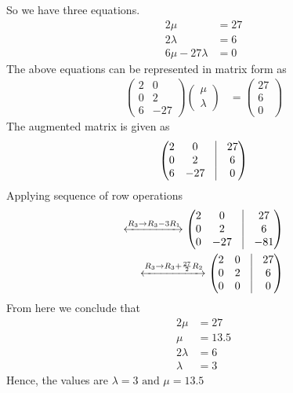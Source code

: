 \documentclass[12pt]{article}
\newcommand{\myvec}[1]{\ensuremath{\begin{pmatrix}#1\end{pmatrix}}}
\begin{document}
So we have three equations.
\begin{align}
	2\mu&=27\\
	2\lambda&=6\\
	6\mu-27\lambda&=0
\end{align}
The above equations can be represented in matrix form as
\begin{align}
	\myvec{2&0\\0&2\\6&-27}\myvec{\mu\\\lambda}&=\myvec{27\\6\\0}
\end{align}
The augmented matrix is given as
\begin{align}
	\myvec{2 & 0 & \vrule & 27\\0 & 2 & \vrule & 6\\ 6 & -27 & \vrule & 0}
\end{align}
Applying sequence of row operations
\begin{align}
	\xleftrightarrow{R_{3}\rightarrow R_{3}-3R_{1}}  	
	\myvec{2 & 0 & \vrule & 27\\0 & 2 & \vrule & 6\\ 0 & -27 & \vrule & -81}\\
	\xleftrightarrow{R_{3}\rightarrow R_{3}+\frac{27}{2}R_{2}}  	
	\myvec{2 & 0 & \vrule & 27\\0 & 2 & \vrule & 6\\ 0 & 0 & \vrule & 0}
\end{align}
From here we conclude that
\begin{align}
	2\mu&=27\\
	\mu&=13.5\\
	2\lambda&=6\\
	\lambda&=3
\end{align}
Hence, the values are $\lambda = 3 \text{ and } \mu = 13.5$
\end{document}
